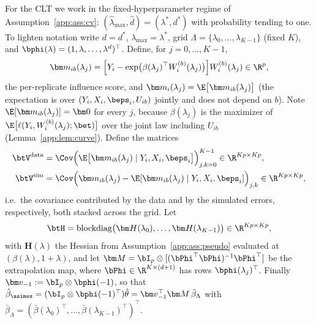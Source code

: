 For the CLT we work in the fixed-hyperparameter regime of
Assumption~\ref{app:ass:cv}: $(\hat\lambda_{\max},\hat d)=(\lambda^*,d^*)$
with probability tending to one. To lighten notation write
$d=d^*$, $\lambda_{\max}=\lambda^*$, grid
$\Lambda=\{\lambda_0,\dots,\lambda_{K-1}\}$ (fixed $K$), and
$\bphi(\lambda)=(1,\lambda,\dots,\lambda^d)^\top$.
Define, for $j=0,\dots,K-1$,
\[
  \bm m_{ib}(\lambda_j)
  =\Bigl[Y_i-\exp\bigl(\beta(\lambda_j)^\top W_i^{(b)}(\lambda_j)\bigr)\Bigr]
   W_i^{(b)}(\lambda_j)\in\R^p,
\]
the per-replicate influence score, and
$\bm m_i(\lambda_j)=\E\bigl[\bm m_{ib}(\lambda_j)\bigr]$ (the expectation
is over $(Y_i,X_i,\beps_i,U_{ib})$ jointly and does not depend on $b$).
Note $\E[\bm m_{ib}(\lambda_j)]=\bm 0$ for every $j$, because
$\beta(\lambda_j)$ is the maximizer of
$\E\bigl[\ell(Y_i,W_i^{(b)}(\lambda_j);\bet)\bigr]$ over the joint law
including $U_{ib}$ (Lemma~\ref{app:lem:curve}). Define the matrices
\begin{align}
  \btV^{\mathrm{data}}
  &=\Cov\Bigl(\E\bigl[\bm m_{ib}(\lambda_j)\mid
        Y_i,X_i,\beps_i\bigr]\Bigr)_{j,k=0}^{K-1}
   \in\R^{Kp\times Kp},\label{app:eq:vdata}\\
  \btV^{\mathrm{sim}}
  &=\Cov\Bigl(\bm m_{ib}(\lambda_j)-\E[\bm m_{ib}(\lambda_j)\mid
        Y_i,X_i,\beps_i]\Bigr)_{j,k}
   \in\R^{Kp\times Kp},\label{app:eq:vsim}
\end{align}
i.e.\ the covariance contributed by the data and by the simulated errors,
respectively, both stacked across the grid. Let
\[
  \btH=\operatorname{blockdiag}\bigl(\bm H(\lambda_0),\dots,
        \bm H(\lambda_{K-1})\bigr)\in\R^{Kp\times Kp},
\]
with $\bm H(\lambda)$ the Hessian from Assumption~\ref{app:ass:pseudo}
evaluated at $(\beta(\lambda),1+\lambda)$, and let
$\bm M=\bI_{p}\otimes[(\bPhi^\top\bPhi)^{-1}\bPhi^\top]$ be the
extrapolation map, where $\bPhi\in\R^{K\times(d+1)}$ has rows
$\bphi(\lambda_j)^\top$. Finally
$\bm v_{-1}:=\bI_p\otimes\bphi(-1)$, so that
$\hat\beta_{\asimex}=(\bI_p\otimes\bphi(-1)^\top)\hat\theta
=\bm v_{-1}^\top\bm M\,\bar\beta_{\Lambda}$
with $\bar\beta_{\Lambda}
=(\bar\beta(\lambda_0)^\top,\dots,\bar\beta(\lambda_{K-1})^\top)^\top$.


